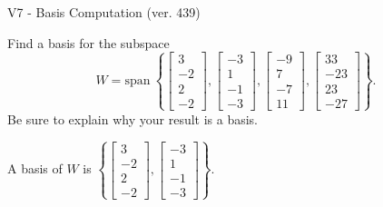 \begin{exercise}
  \begin{exerciseTitle}V7 - Basis Computation (ver. 439)\end{exerciseTitle}
  \begin{exerciseStatement}
    Find a basis for the subspace 
\[W=\mathrm{span}\ \left\{\left[\begin{array}{r}
3 \\
-2 \\
2 \\
-2
\end{array}\right] , \left[\begin{array}{r}
-3 \\
1 \\
-1 \\
-3
\end{array}\right] , \left[\begin{array}{r}
-9 \\
7 \\
-7 \\
11
\end{array}\right] , \left[\begin{array}{r}
33 \\
-23 \\
23 \\
-27
\end{array}\right]\right\}.\]
 Be sure to explain why your result is a basis.


  \end{exerciseStatement}
  \begin{exerciseAnswer}
   A basis of \(W\) is  \(\left\{\left[\begin{array}{r}
3 \\
-2 \\
2 \\
-2
\end{array}\right] , \left[\begin{array}{r}
-3 \\
1 \\
-1 \\
-3
\end{array}\right]\right\}\).
  


  \end{exerciseAnswer}
\end{exercise}